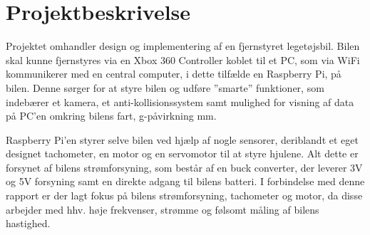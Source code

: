 \chapter{Projektbeskrivelse}

Projektet omhandler design og implementering af en fjernstyret legetøjsbil. 
Bilen skal kunne fjernstyres via en Xbox 360 Controller koblet til et PC, som via WiFi kommunikerer med en central computer, i dette tilfælde en Raspberry Pi, på bilen.
Denne sørger for at styre bilen og udføre ''smarte'' funktioner, som indebærer et kamera, et anti-kollisionssystem samt mulighed for visning af data på PC'en omkring bilens fart, g-påvirkning mm.

Raspberry Pi'en styrer selve bilen ved hjælp af nogle sensorer, deriblandt et eget designet tachometer, en motor og en servomotor til at styre hjulene.
Alt dette er forsynet af bilens strømforsyning, som består af en buck converter, der leverer 3V og 5V forsyning samt en direkte adgang til bilens batteri.
I forbindelse med denne rapport er der lagt fokus på bilens strømforsyning, tachometer og motor, da disse arbejder med hhv. høje frekvenser, strømme og følsomt måling af bilens hastighed.